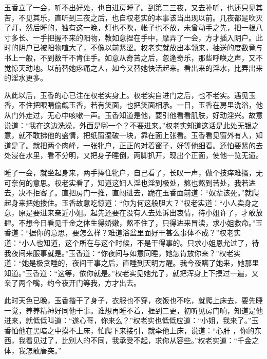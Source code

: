 \documentclass[a4paper,12pt,UTF8,twoside]{ctexbook}
\begin{document}
玉香立了一会，听不出好处，也自进房睡了。到第二三夜，又去补听，也还只见其苦，不见其乐，直听到三夜之后，也自权老实的本事该当出现以前。几夜都是吹灭了灯，然后睡的，独有这一晚，灯也不吹，帐子也不放，未曾动手之先，把一根八寸多长、一手把握不来的阳物，教如意捏在手中，摩弄了一会，方才插入阴户。此时的阴户已被阳物喧大了，不像以前紧涩。权老实就放出本领来，抽送的度数竟与书上一般，不到数千不肯住手。如意从奇苦之后，忽逢奇乐，那些呼唤之声，又不觉惊天动地。以前替她疼痛之人，如今又替她快活起来。看出来的淫水，比弄出来的淫水更多。

从此以后，玉香的心已注在权老实身上。权老实自进门之后，也不老实。遇见玉香，不住把眼睛偷觑玉香，若有笑面，也把笑面相承。一日，玉香在房里洗浴，他从门外走过，无心中咳嗽一声。玉香知道是他，要引他看看肌肤，好动淫兴。故意说道：“我在这边洗澡，外面是哪一个？不要进来。”权老实知道这话是此处无银之意，就不敢拂他的盛情，把纸窗湿破一块，靠在面上张看。玉香看见窗外有人，知道是了。就把两个肉峰，一张牝户，正正的对着窗子，好等他细看。还怕要紧的去处浸在水里，看不分明，又把身子睡倒，两脚扒开，现出个正面，使他一览无遗。

睡了一会，就坐起身来，两手捧住牝户，自己看了，长叹一声，做个技痒难搔，无可奈何的意思。权老实看了，知道这妇人淫也淫到极处，熬也熬到苦处，我若进去，决不拒客了。直把房门一推，直闯进去，跪在玉香面前道：“奴辈该死。”就爬起身来把她搂住。玉香故意吃惊道：“你为何这般胆大？”权老实道：“小人卖身之意，原是要进来亲近小姐。起先还要在没有人去处诉出衷情，待小姐许了，才敢放肆。不想今日看见千金之体生得娇嫩，熬不住了，只得进来冒渎，求小姐救命。”玉香道：“据你的意思，要怎么样？难道浴盆里面好干甚么事体不成？”权老实道：“小人也知道，这个所在与这个时候，不是干得事的。只求小姐恩允过了，待我夜间来服事就是。”玉香道：“你夜间与如意同睡，她怎肯放你来？”权老实道：“她是极贪睡的，夜间干事之后，直睡到天明方醒。我今夜瞒了她来，她那里知道。”玉香道：“这等，依你就是。”权老实见她允了，就把浑身上下摸过一遍，又亲了两个嘴，约今夜开门等我，方才出去。

此时天色已晚，玉香揩干了身子，衣服也不穿，夜饭也不吃，就爬上床去，要先睡一觉，养养精神好同他干事。谁想再睡不着，捱到二更，初听见房门响，知道是他进来，就低低叫道：“遂心哥，你来么？”权老实也低低应道：“小姐，我来了。”玉香怕他在黑暗之中摸不上床，忙爬下来接引，就牵他上床，说道：“心肝 ，你的东西，我看见过了，比别人的不同，我承受不起，求你从容些。”权老实道：“千金之体，我怎敢唐突。”
\end{document}
